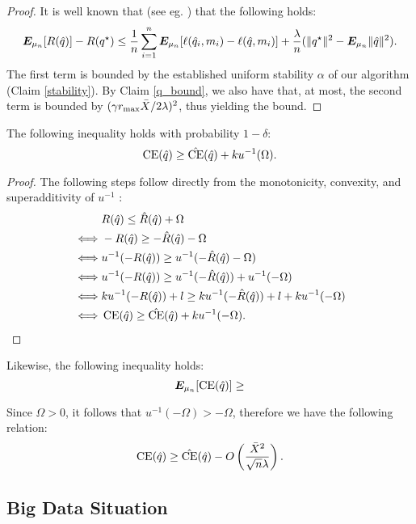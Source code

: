 \documentclass[11pt]{article}
\begin{document}
\begin{proof}
  It is well known that (see eg. \cite{koren2015fast}) that the following holds:
  \[
    \bm E_{\mu_n}[R(\hat q)] - R(q^\star) \leq \frac{1}{n}\sum_{i=1}^n\bm E_{\mu_n}[\ell(\hat
    q_i, m_i) - \ell(\hat q, m_i)] + \frac{\lambda}{n}(\|q^\star\|^2 - \bm E_{\mu_n}\|\hat
    q\|^2).
  \]
  The first term is bounded by the established uniform stability $\alpha$ of our algorithm
  (Claim \ref{stability}). By Claim \ref{q_bound}, we also have that, at most, the second
  term is bounded by $(\gamma r_{\max}\bar X/2\lambda)^2$, thus yielding the bound.
\end{proof}

\begin{thm}
  \label{thm2}
  The following inequality holds with probability $1-\delta$:
  \[
    \operatorname{CE}(\hat q) \geq \hat{\operatorname{CE}}(\hat q) + ku^{-1}(\Omega).
  \]
\end{thm}

\begin{proof}
  The following steps follow directly from the monotonicity, convexity, and
  superadditivity of $u^{-1}$ :
  \begin{align*}
    & R(\hat q) \leq \hat R(\hat q) + \Omega\\
    \iff & -R(\hat q) \geq -\hat R(\hat q) - \Omega\\
    \iff & u^{-1}(-R(\hat q)) \geq u^{-1}(-\hat R(\hat q) - \Omega)\\
    \iff & u^{-1}(-R(\hat q)) \geq u^{-1}(-\hat R(\hat q)) + u^{-1}(-\Omega)\\
    \iff & ku^{-1}(-R(\hat q))+l \geq ku^{-1}(-\hat R(\hat q))+l + ku^{-1}(-\Omega)\\
    \iff & \operatorname{CE}(\hat q) \geq \hat{\operatorname{CE}}(\hat q) + ku^{-1}(-\Omega).\qedhere
  \end{align*}
\end{proof}

\begin{thm}
  \label{thm4}
  Likewise, the following inequality holds:
  \[
    \bm E_{\mu_n}[\operatorname{CE}(\hat q)] \geq 
  \]
\end{thm}

Since $\Omega>0$, it follows that $u^{-1}(-\Omega) > -\Omega$, therefore we have the
following relation:
\[
  \operatorname{CE}(\hat q) \geq \hat{\operatorname{CE}}(\hat q) - O\left(\frac{\bar X^2}{\sqrt{n}\lambda}\right).
\]


\subsection{Big Data Situation}
\end{document}
